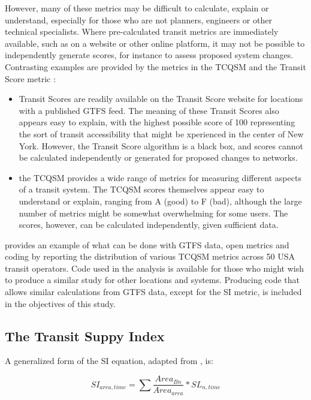\documentclass[preprint, 3p,
authoryear]{elsarticle} %
\begin{document}
However, many of these metrics may be difficult to calculate, explain or
understand, especially for those who are not planners, engineers or
other technical specialists. Where pre-calculated transit metrics are
immediately available, such as on a website or other online platform, it
may not be possible to independently generate scores, for instance to
assess proposed system changes. Contrasting examples are provided by the
metrics in the TCQSM and the Transit Score metric
\citep{WalkScore:2023tg}:

\begin{itemize}
\item
  Transit Scores are readily available on the Transit Score website for
  locations with a published GTFS feed. The meaning of these Transit
  Scores also appears easy to explain, with the highest possible score
  of 100 representing the sort of transit accessibility that might be
  xperienced in the center of New York. However, the Transit Score
  algorithm is a black box, and scores cannot be calculated
  independently or generated for proposed changes to networks.
\item
  the TCQSM provides a wide range of metrics for measuring different
  aspects of a transit system. The TCQSM scores themselves appear easy
  to understand or explain, ranging from A (good) to F (bad), although
  the large number of metrics might be somewhat overwhelming for some
  users. The scores, however, can be calculated independently, given
  sufficient data.
\end{itemize}

\citet{Wong:2013aa} provides an example of what can be done with GTFS
data, open metrics and coding by reporting the distribution of various
TCQSM metrics across 50 USA transit operators. Code used in the
\citet{Wong:2013aa} analysis is available for those who might wish to
produce a similar study for other locations and systems. Producing code
that allows similar calculations from GTFS data, except for the SI
metric, is included in the objectives of this study.

\subsection{The Transit Suppy Index}\label{the-transit-suppy-index}

A generalized form of the SI equation, adapted from
\citet{currie2010identifying}, is:

\[SI_{area, time} = \sum{\frac{Area_{Bn}}{Area_{area}}*SL_{n, time}}\]
\end{document}
